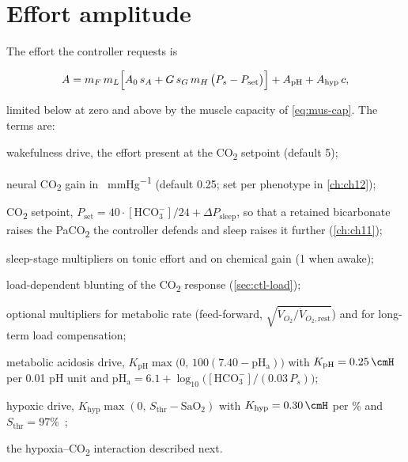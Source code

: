 \section{Effort amplitude}
\label{sec:ctl-amp}
The effort the controller requests is
\begin{keyequation}
\begin{equation}
A = m_{F}\,m_{L}\Bigl[A_0\,s_A + G\,s_G\,m_{H}\,\bigl(P_s - P_{\mathrm{set}}\bigr)\Bigr] + A_{\mathrm{pH}} + A_{\mathrm{hyp}}\,c,
\label{eq:ctl-amp}
\end{equation}
\end{keyequation}
limited below at zero and above by the muscle capacity of \cref{eq:mus-cap}. The terms are:
\begin{description}[leftmargin=1.2cm,style=nextline]
\item[$A_0$] wakefulness drive, the effort present at the CO\textsubscript{2} setpoint (default \SI{5}{\cmH});
\item[$G$] neural CO\textsubscript{2} gain in \si{\cmH\per\mmHg} (default 0.25; set per phenotype in \cref{ch:ch12});
\item[$P_{\mathrm{set}}$] CO\textsubscript{2} setpoint, $P_{\mathrm{set}} = 40\cdot[\mathrm{HCO_3^-}]/24 + \Delta P_{\mathrm{sleep}}$, so that a retained bicarbonate raises the PaCO\textsubscript{2} the controller defends and sleep raises it further (\cref{ch:ch11});
\item[$s_A$, $s_G$] sleep-stage multipliers on tonic effort and on chemical gain (1 when awake);
\item[$m_H$] load-dependent blunting of the CO\textsubscript{2} response (\cref{sec:ctl-load});
\item[$m_F$, $m_L$] optional multipliers for metabolic rate (feed-forward, $\sqrt{\dot V_{O_2}/\dot V_{O_2,\mathrm{rest}}}$) and for long-term load compensation;
\item[$A_{\mathrm{pH}}$] metabolic acidosis drive, $K_{\mathrm{pH}}\max\bigl(0,\,100(7.40-\mathrm{pH_a})\bigr)$ with $K_{\mathrm{pH}} = \SI{0.25}{\cmH}$ per 0.01 pH unit and $\mathrm{pH_a} = 6.1 + \log_{10}\bigl([\mathrm{HCO_3^-}]/(0.03\,P_s)\bigr)$;
\item[$A_{\mathrm{hyp}}$] hypoxic drive, $K_{\mathrm{hyp}}\max(0,\,S_{\mathrm{thr}} - \mathrm{SaO_2})$ with $K_{\mathrm{hyp}} = \SI{0.30}{\cmH}$ per \% and $S_{\mathrm{thr}} = 97\%$~\citep{duffin2000};
\item[$c$] the hypoxia--CO\textsubscript{2} interaction described next.
\end{description}

